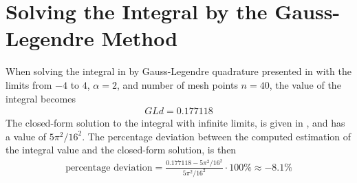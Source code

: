 \section{Solving the Integral by the Gauss-Legendre Method}
\label{sec:ResultsGaussLegendreMethod}
When solving the integral in  by Gauss-Legendre quadrature presented in  with the limits from $-4$ to $4$, $\alpha = 2$, and number of mesh points $n=40$, the value of the integral becomes
\begin{align}
	GLd = 0.177118
\end{align}
The closed-form solution to the integral with infinite limits, is given in , and has a value of $5\pi^2 /16^2$.
The percentage deviation between the computed estimation of the integral value and the closed-form solution, is then
\begin{align}
	\text{percentage deviation} = \frac{0.177118 - 5\pi^2 /16^2}{5\pi^2 /16^2} \cdot 100 \% \approx -8.1 \%
\end{align}

